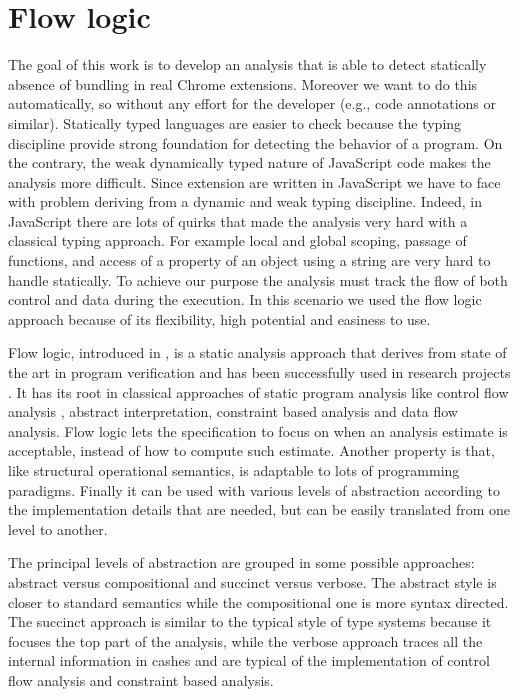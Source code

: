 \section{Flow logic}
\label{sec:FlowLogic}
The goal of this work is to develop an analysis that is able to detect statically absence of bundling in real Chrome extensions. Moreover we want to do this automatically, so without any effort for the developer (e.g., code annotations or similar). Statically typed languages are easier to check because the typing discipline provide strong foundation for detecting the behavior of a program. On the contrary, the weak dynamically typed nature of JavaScript code makes the analysis more difficult. Since extension are written in JavaScript we have to face with problem deriving from a dynamic and weak typing discipline. Indeed, in JavaScript there are lots of quirks that made the analysis very hard with a classical typing approach. For example local and global scoping, passage of functions, and access of a property of an object using a string are very hard to handle statically. To achieve our purpose the analysis must track the flow of both control and data during the execution. In this scenario we used the flow logic approach because of its flexibility, high potential and easiness to use.

Flow logic, introduced in \cite{FlowLogic}, is a static analysis approach that derives from state of the art in program verification and has been successfully used in research projects \cite{CarmelFlowLogic,CarmelFlowLogicFormalization}. It has its root in classical approaches of static program analysis \cite{PrincipleProgramAnalysis} like control flow analysis \cite{CMLCFA}, abstract interpretation, constraint based analysis and data flow analysis. Flow logic lets the specification to focus on when an analysis estimate is acceptable, instead of how to compute such estimate. Another property is that, like structural operational semantics, is adaptable to lots of programming paradigms. Finally it can be used with various levels of abstraction according to the implementation details that are needed, but can be easily translated from one level to another. 

The principal levels of abstraction are grouped in some possible approaches: abstract versus compositional and succinct versus verbose. The abstract style is closer to standard semantics while the compositional one is more syntax directed. The succinct approach is similar to the typical style of type systems because it focuses the top part of the analysis, while the verbose approach traces all the internal information in cashes and are typical of the implementation of control flow analysis and constraint based analysis.

